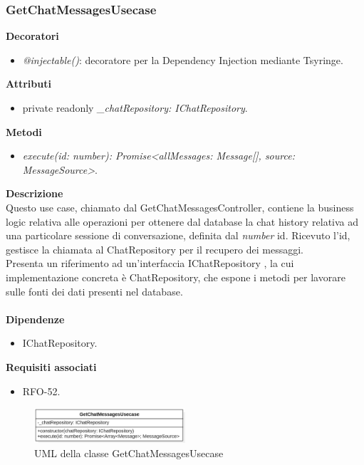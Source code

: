\subsubsection{GetChatMessagesUsecase}
\textbf{Decoratori}
\begin{itemize}
    \item \textit{@injectable()}: decoratore per la Dependency Injection mediante Tsyringe.
\end{itemize}
\textbf{Attributi}
\begin{itemize}
    \item private readonly \textit{\_chatRepository: IChatRepository}.
\end{itemize}
\textbf{Metodi}
\begin{itemize}
    \item \textit{execute(id: number): Promise<allMessages: Message[], source: MessageSource>}.
\end{itemize}
\textbf{Descrizione}\\
Questo use case, chiamato dal GetChatMessagesController, contiene la business logic relativa alle operazioni per ottenere dal database la chat history relativa ad una particolare sessione di conversazione, definita dal \textit{number} id. Ricevuto l'id, gestisce la chiamata al ChatRepository per il recupero dei messaggi.\\
Presenta un riferimento ad un'interfaccia IChatRepository , la cui implementazione concreta è ChatRepository, che espone i metodi per lavorare sulle fonti dei dati presenti nel database.\\ \\
\textbf{Dipendenze}
\begin{itemize}
    \item IChatRepository.
\end{itemize}
\textbf{Requisiti associati}
\begin{itemize}
    \item RFO-52.
\end{itemize}

\begin{figure}[h!]
    \centering  
    \includegraphics[width=0.5\textwidth]{GetChatMessagesUsecase.png}
    \caption{UML della classe GetChatMessagesUsecase}
\end{figure}

